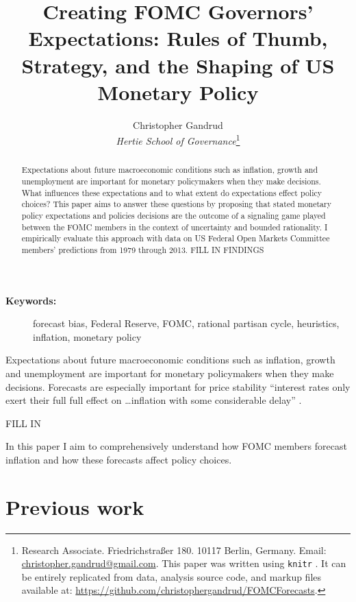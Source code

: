 \documentclass[a4paper]{article}\usepackage{graphicx, color}
\title{Creating FOMC Governors' Expectations: Rules of Thumb, Strategy, and the Shaping of US Monetary Policy}
\author{Christopher Gandrud \\
                {\emph{Hertie School of Governance}}\footnote{Research Associate. Friedrichstra{\ss}er 180. 10117 Berlin, Germany. Email: \href{mailto:christopher.gandrud@gmail.com}{christopher.gandrud@gmail.com}. This paper was written using {\tt{knitr}} \citep{R-knitr}. It can be entirely replicated from data, analysis source code, and markup files available at: {\url{https://github.com/christophergandrud/FOMCForecasts}}.}}
\begin{document}
\maketitle

\begin{abstract}
    Expectations about future macroeconomic conditions such as inflation, growth and unemployment are important for monetary policymakers when they make decisions. What influences these expectations and to what extent do expectations effect policy choices? This paper aims to answer these questions by proposing that stated monetary policy expectations and policies decisions are the outcome of a signaling game played between the FOMC members in the context of uncertainty and bounded rationality. I empirically evaluate this approach with data on US Federal Open Markets Committee members' predictions from 1979 through 2013. FILL IN FINDINGS
\end{abstract}

\begin{description}
  \item [{\textbf{Keywords:}}] forecast bias, Federal Reserve, FOMC, rational partisan cycle, heuristics, inflation, monetary policy
\end{description}


Expectations about future macroeconomic conditions such as inflation, growth and unemployment are important for monetary policymakers when they make decisions. Forecasts are especially important for price stability ``interest rates only exert their full full effect on \ldots inflation with some considerable delay'' \cite[59]{Goodhart2001}.

FILL IN

In this paper I aim to comprehensively understand how FOMC members forecast inflation and how these forecasts affect policy choices.

\section{Previous work}
\end{document}
